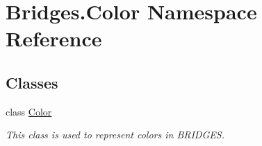 \hypertarget{namespace_bridges_1_1_color}{}\section{Bridges.\+Color Namespace Reference}
\label{namespace_bridges_1_1_color}
\subsection*{Classes}
\begin{DoxyCompactItemize}
\item 
class \mbox{\hyperlink{class_bridges_1_1_color_1_1_color}{Color}}
\begin{DoxyCompactList}\small\item\em This class is used to represent colors in B\+R\+I\+D\+G\+ES. \end{DoxyCompactList}\end{DoxyCompactItemize}
